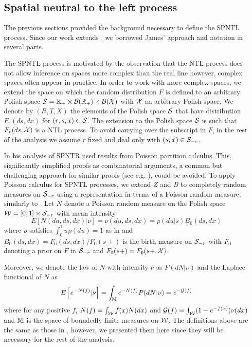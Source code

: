 \subsection{Spatial neutral to the left process}\label{SPNTL_process}
The previous sections provided the background necessary to define the SPNTL process. Since our work extends \cite{james2006poisson}, we borrowed James' approach and notation in several parts. 

The SPNTL process is motivated by the observation that the NTL process does not allow inference on spaces more complex than the real line however, complex spaces often appear in practice. In order to work with more complex spaces, we extend the space on which the random distribution $F$ is defined to an arbitrary Polish space $\mathcal{S} = \mathbb{R}_{+} \times \mathcal{B}(\mathbb{R}_{+}) \times \mathcal{B}(\mathcal{X})$ with $\mathcal{X}$ an arbitrary Polish space. We denote by $(R, T, X)$ the elements of the Polish space $\mathcal{S}$ that have distribution $F_r(ds, dx)$ for $(r, s, x) \in \cal{S}$. The extension to the Polish space $\mathcal{S}$ is such that $F_r(ds, \mathcal{X})$ is a NTL process. To avoid carrying over the subscript in $F$, in the rest of the analysis we assume $r$ fixed and deal only with $(s, x) \in \mathcal{S}_{-r}$.

In his analysis of SPNTR \cite{james2006poisson} used results from Poisson partition calculus. This, significantly simplified proofs as combinatorial arguments, a common but challenging approach for similar proofs (see e.g. \cite{antoniak1974mixtures,pitman2002combinatorial}), could be avoided. To apply Poisson calculus for SPNTL processes, we extend $Z$ and $B$ to completely random measures on $\mathcal{S}_{-r}$ using a representation in terms of a Poisson random measure, similarly to \cite{james2006poisson}. Let $N$ denote a Poisson random measure on the Polish space $\mathcal{W} = [0,1] \times \mathcal{S}_{-r}$ with mean intensity 
\begin{equation*}
E[N(du, ds, dx) | \nu] = \nu(du, ds, dx) = \rho(du | s)B_0(ds, dx)
\end{equation*}
where $\rho$ satisfies $\int_0^1 u \rho(du) = 1$ as in \cite{james2006poisson} and $B_0(ds, dx) = F_0(ds, dx)/F_0(s+)$ is the birth measure on $\mathcal{S}_{-r}$ with $F_0$ denoting a prior on $F$ in $\mathcal{S}_{-r}$ and $F_0(s+) = F_0(s+, \mathcal{X})$.

Moreover, we denote the law of $N$ with intensity $\nu$ as $P(dN|\nu)$ and the Laplace functional of $N$ as
\begin{equation*}
E\left[e^{-N(f)}|\nu\right] = \int_{\mathbb{M}} e^{-N(f)}P(dN|\nu) = e^{-\mathcal{G}(f)}
\end{equation*}
where for any positive $f$, $N(f) = \int_{\mathcal{W}} f(x)N(dx)$ and $\mathcal{G}(f) =\int_{\mathcal{W}}(1-e^{-f(x)})\nu(dx)$ and $\mathbb{M}$ is the space of boundedly finite measures on $\cal{W}$. The definitions above are the same as those in \cite{james2006poisson}, however, we presented them here since they will be necessary for the rest of the analysis.

